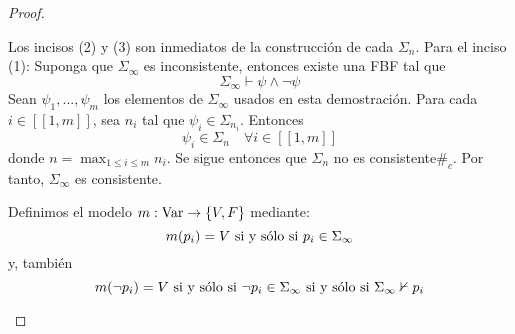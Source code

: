 \documentclass[12pt]{report}
\newcounter{it}
\theoremstyle{largebreak}
\newcommand\cf[3]{\ensuremath{#1:#2\rightarrow#3}}
\newcommand\contradiction{\ensuremath{\#_c}}
\newcommand\natint[1]{\ensuremath{\left[\!\left[ #1\right]\!\right]}}
\begin{document}
\begin{proof}
\begin{itemize}
\begin{enumerate}
            \end{enumerate}
            Los incisos (2) y (3) son inmediatos de la construcción de cada $\Sigma_n$. Para el inciso (1): Suponga que $\Sigma_\infty$ es inconsistente, entonces existe una FBF tal que
            \begin{equation*}
                \Sigma_\infty\vdash\psi\land\neg\psi
            \end{equation*}
            Sean $\psi_1,...,\psi_m$ los elementos de $\Sigma_\infty$ usados en esta demostración. Para cada $i\in\natint{1,m}$, sea $n_i$ tal que $\psi_i\in\Sigma_{ n_i}$. Entonces
            \begin{equation*}
                \psi_i\in\Sigma_{n}\quad\forall i\in\natint{1,m}
            \end{equation*}
            donde $n=\max_{1\leq i\leq m}n_i$. Se sigue entonces que $\Sigma_n$ no es consistente\contradiction. Por tanto, $\Sigma_\infty$ es consistente.

            Definimos el modelo $\cf{m}{\textup{Var}}{\left\{V,F\right\}}$ mediante:
            \begin{equation*}
                m(p_i)=V\textup{ si y sólo si }p_i\in\Sigma_{\infty}
            \end{equation*}
            y, también
            \begin{equation*}
                m(\neg p_i)=V\textup{ si y sólo si }\neg p_i\in\Sigma_{\infty}\textup{ si y sólo si }\Sigma_\infty\nvdash p_i
            \end{equation*}


\end{itemize}
\end{proof}
\end{document}
